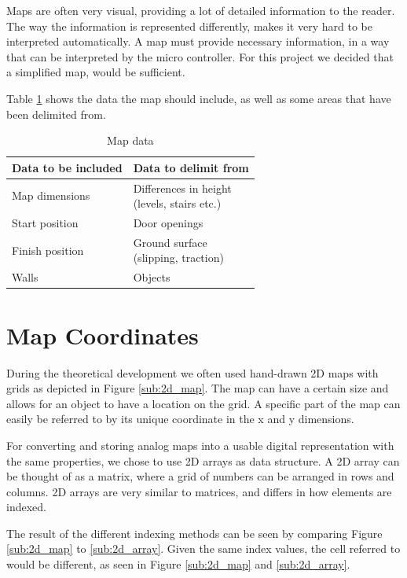 Maps are often very visual, providing a lot of detailed information to the reader.
The way the information is represented differently,
makes it very hard to be interpreted automatically.
A map must provide necessary information,
in a way that can be interpreted by the micro controller.
For this project we decided that a simplified map, would be sufficient.

Table \ref{table:map_data} shows the data the map should include,
as well as some areas that have been delimited from.

\begin{table}[h!]
	\centering
	\caption{Map data}
	\begin{tabular}{|p{}||p{}|}
		\hline
		Data to be included & Data to delimit from \\ 
		\hline
		Map dimensions 		& \parbox[t]{0.4\textwidth}{Differences in height\\(levels, stairs etc.)}\\
		\hline
		Start position 		& Door openings \\
		\hline
		Finish position 	& \parbox[t]{0.4\textwidth}{Ground surface\\(slipping, traction)} \\
		\hline
		Walls 				& Objects\\
		\hline
	\end{tabular}
	\label{table:map_data}
\end{table}

\section{Map Coordinates}
\label{sec:map_coordinates} %
During the theoretical development we often used hand-drawn 2D maps with grids as depicted in Figure \ref{sub:2d_map}. The map can have a certain size and allows for an object to have a location on the grid. A specific part of the map can easily be referred to by its unique coordinate in the x and y dimensions. 

For converting and storing analog maps into a usable digital representation with the same properties, we chose to use 2D arrays as data structure. A 2D array can be thought of as a matrix, where a grid of numbers can be arranged in rows and columns. 2D arrays are very similar to matrices, and differs in how elements are indexed.

The result of the different indexing methods can be seen by comparing Figure \ref{sub:2d_map} to \ref{sub:2d_array}. Given the same index values, the cell referred to would be different, as seen in  Figure \ref{sub:2d_map} and \ref{sub:2d_array}.


